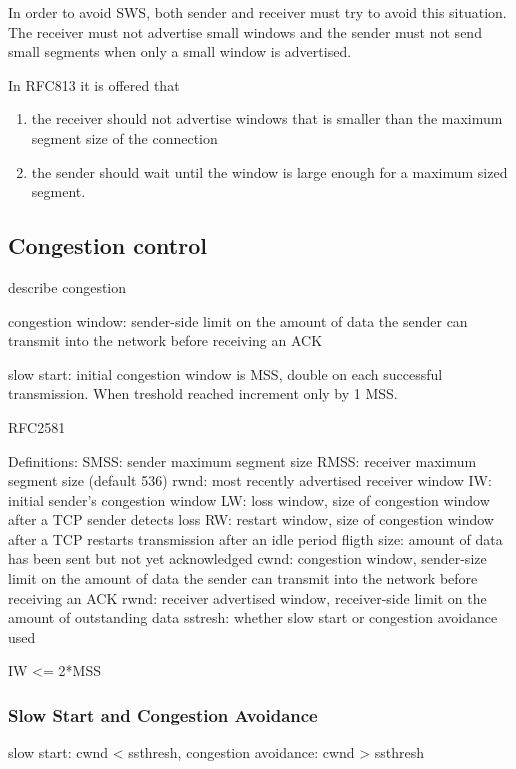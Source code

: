 In order to avoid SWS, both sender and receiver must try to avoid this
situation. The receiver must not advertise small windows and the sender
must not send small segments when only a small window is advertised.

In RFC813 it is offered that
\begin{enumerate}
  \item the receiver should not advertise windows that is smaller than the maximum
        segment size of the connection
  \item the sender should wait until the window is large enough for a maximum sized
        segment. 
\end{enumerate}

\subsection{Congestion control}

describe congestion

congestion window: sender-side limit on the amount of data the sender can transmit
                   into the network before receiving an ACK

slow start: initial congestion window is MSS, double on each successful transmission.
When treshold reached increment only by 1 MSS.


RFC2581

Definitions:
SMSS: sender maximum segment size
RMSS: receiver maximum segment size (default 536)
rwnd: most recently advertised receiver window
IW: initial sender's congestion window
LW: loss window, size of congestion window after a TCP sender detects loss
RW: restart window, size of congestion window after a TCP restarts transmission after an idle period
fligth size: amount of data has been sent but not yet acknowledged
cwnd: congestion window, sender-size limit on the amount of data the sender
      can transmit into the network before receiving an ACK
rwnd: receiver advertised window, receiver-side limit on the amount of outstanding data
sstresh: whether slow start or congestion avoidance used

IW <= 2*MSS


\subsubsection*{Slow Start and Congestion Avoidance}

slow start: cwnd < ssthresh, congestion avoidance: cwnd > ssthresh

